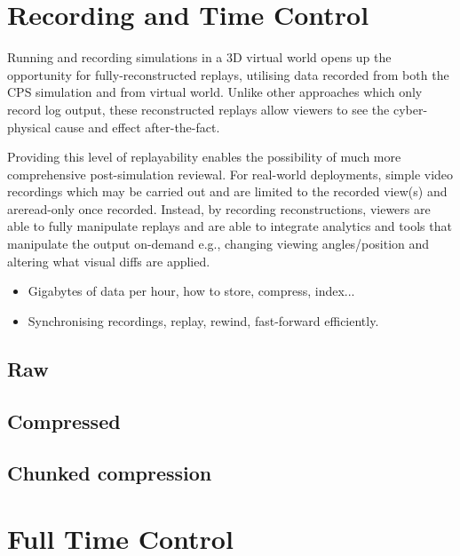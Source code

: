 
\section{Recording and Time Control}
\label{sec:recording}
Running and recording simulations in a 3D virtual world opens up the opportunity for fully-reconstructed replays, utilising data recorded from both the CPS simulation and from virtual world. Unlike other approaches which only record log output, these reconstructed replays allow viewers to see the cyber-physical cause and effect after-the-fact. 

Providing this level of replayability enables the possibility of much more comprehensive post-simulation reviewal. For real-world deployments, simple video recordings which may be carried out and are limited to the recorded view(s) and areread-only once recorded. Instead, by recording reconstructions, viewers are able to fully manipulate replays and are able to integrate analytics and tools that manipulate the output on-demand e.g., changing viewing angles/position and altering what visual diffs are applied.


\begin{itemize}
  \item Gigabytes of data per hour, how to store, compress, index...
  \item Synchronising recordings, replay, rewind, fast-forward efficiently.
\end{itemize}
\subsection{Raw} %
\label{sub:raw}


\subsection{Compressed} %
\label{sub:compressed}


\subsection{Chunked compression} %
\label{sub:chunked_compression}

\section{Full Time Control} %
\label{sec:full_time_control}

